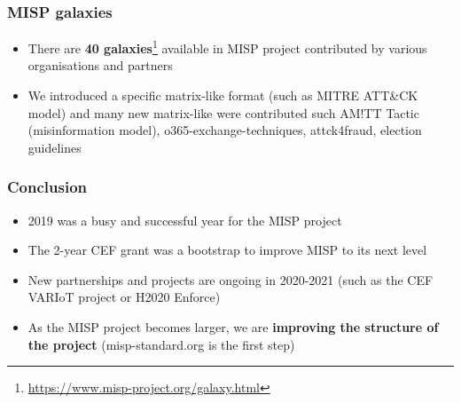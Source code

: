 \begin{frame}
        \frametitle{MISP galaxies}
        \begin{itemize}
                \item There are {\bf 40 galaxies}\footnote{\url{https://www.misp-project.org/galaxy.html}} available in MISP project contributed by various organisations and partners
                \item We introduced a specific matrix-like format (such as MITRE ATT\&CK model) and many new matrix-like were contributed such AM!TT Tactic (misinformation model), o365-exchange-techniques, attck4fraud, election guidelines
        \end{itemize}
\end{frame}


\begin{frame}
        \frametitle{Conclusion}
        \begin{itemize}
                \item 2019 was a busy and successful year for the MISP project
                \item The 2-year CEF grant was a bootstrap to improve MISP to its next level
                \item New partnerships and projects are ongoing in 2020-2021 (such as the CEF VARIoT project or H2020 Enforce)
                \item As the MISP project becomes larger, we are {\bf improving the structure of the project} (misp-standard.org is the first step)
        \end{itemize}
\end{frame}


